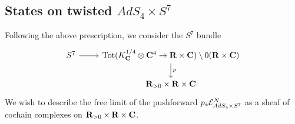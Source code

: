 \documentclass[../main.tex]{subfiles}
\begin{document}

\subsection{States on twisted $AdS_4\times S^7$}\label{s:ads4states}
Following the above prescription, we consider the $S^7$ bundle 
\[
\begin{tikzcd}
S^7 \ar[r] & \operatorname{Tot} (K^{1/4}_\C\otimes \C^4 \to \R\times \C) \setminus 0(\R\times \C) \ar[d, "p"] \\ & \R_{>0}\times \R\times \C
\end{tikzcd}
\]
We wish to describe the free limit of the pushforward $p_* \mathcal{E}^N_{AdS_4\times S^7}$ as a sheaf of cochain complexes on $\mathbf{R}_{>0}\times \mathbf{R}\times \mathbf{C}$. 
\end{document}
